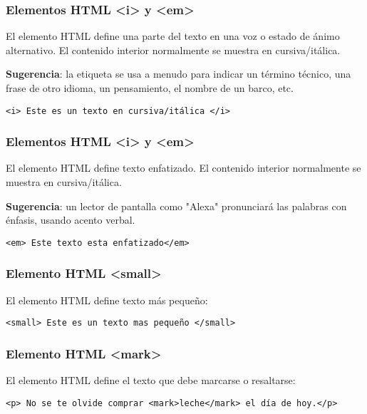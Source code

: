 \begin{frame}[fragile]
  \frametitle{Elementos HTML <i> y <em>}

  El elemento HTML  define una parte del texto en una voz
  o estado de ánimo alternativo. El contenido interior normalmente
  se muestra en cursiva/itálica.

  \vspace{\baselineskip}
  \textbf{Sugerencia}: la  etiqueta se usa a menudo para
  indicar un término técnico, una frase de otro idioma, un
  pensamiento, el nombre de un barco, etc.

  \vspace{\baselineskip}
  \begin{lstlisting}
<i> Este es un texto en cursiva/itálica </i>
  \end{lstlisting}
\end{frame}

\begin{frame}[fragile]
  \frametitle{Elementos HTML <i> y <em>}

  El elemento HTML  define texto enfatizado.
  El contenido interior normalmente se muestra en cursiva/itálica.

  \vspace{\baselineskip}
  \textbf{Sugerencia}: un lector de pantalla como "Alexa"
  pronunciará las palabras  con énfasis, usando acento verbal.

  \vspace{\baselineskip}
  \begin{lstlisting}
<em> Este texto esta enfatizado</em>
  \end{lstlisting}
\end{frame}

\begin{frame}[fragile]
  \frametitle{Elemento HTML <small>}

  El elemento HTML  define texto más pequeño:

  \vspace{\baselineskip}
  \begin{lstlisting}
<small> Este es un texto mas pequeño </small>
  \end{lstlisting}
\end{frame}

\begin{frame}[fragile]
  \frametitle{Elemento HTML <mark>}

  El elemento HTML  define el texto que debe
  marcarse o resaltarse:

  \vspace{\baselineskip}
  \begin{lstlisting}
<p> No se te olvide comprar <mark>leche</mark> el día de hoy.</p>
  \end{lstlisting}
\end{frame}

